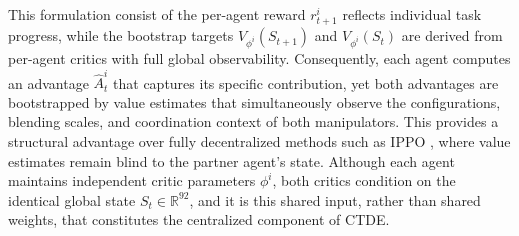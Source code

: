 \documentclass[lettersize,journal]{IEEEtran}
\begin{document}
This formulation consist of the per-agent reward $r_{t+1}^i$ reflects individual task progress, while the bootstrap targets $V_{\phi^i}(S_{t+1})$ and $V_{\phi^i}(S_t)$ are derived from per-agent critics with full global observability. Consequently, each agent computes an advantage $\hat{A}_t^i$ that captures its specific contribution, yet both advantages are bootstrapped by value estimates that simultaneously observe the configurations, blending scales, and coordination context of both manipulators. This provides a structural advantage over fully decentralized methods such as IPPO \cite{IPPO}, where value estimates remain blind to the partner agent's state. Although each agent maintains independent critic parameters $\phi^i$, both critics condition on the identical global state $S_t \in \mathbb{R}^{92}$, and it is this shared input, rather than shared weights, that constitutes the centralized component of CTDE.
\end{document}
